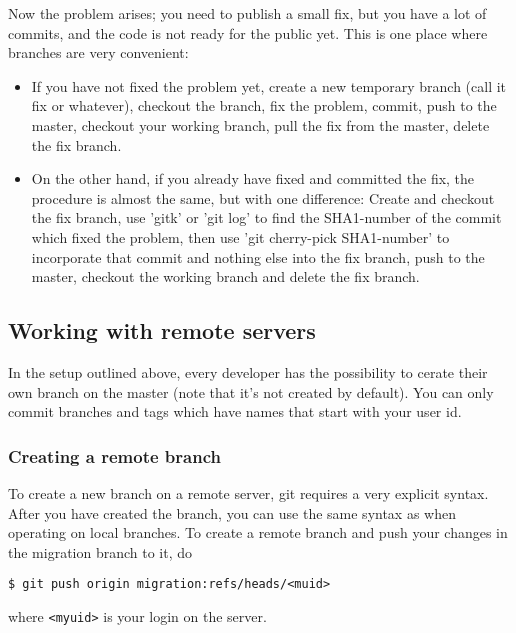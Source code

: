 \documentclass[a4paper,10pt]{article}
\begin{document}
Now the problem arises; you need to publish a small fix, but you have a
lot of commits, and the code is not ready for the public yet. This is
one place where branches are very convenient: 
\begin{itemize}
\item If you have not fixed the
problem yet, create a new temporary branch (call it fix or whatever),
checkout the branch, fix the problem, commit, push to the master,
checkout your working branch, pull the fix from the master, delete the
fix branch. 
\item On the other hand, if you already have fixed and committed
the fix, the procedure is almost the same, but with one difference:
Create and checkout the fix branch, use 'gitk' or 'git log' to find the
SHA1-number of the commit which fixed the problem, then use 'git
cherry-pick SHA1-number' to incorporate that commit and nothing else
into the fix branch, push to the master, checkout the working branch and
delete the fix branch.
\end{itemize}

\subsection{Working with remote servers}
In the setup outlined above, every developer has the
possibility to cerate their own branch on the master (note that it's not
created by default). You can only commit branches and tags which have names
that start with your user id. 

\subsubsection{Creating a remote branch} 
To create a new branch on a remote server, git
requires a very explicit syntax. After you have created the branch, you can
use the same syntax as when operating on local branches. To create a remote 
branch and push your changes in the migration branch to it, do
\begin{verbatim}
$ git push origin migration:refs/heads/<muid>
\end{verbatim}
where {\tt <myuid>} is your login on the server.
\end{document}

